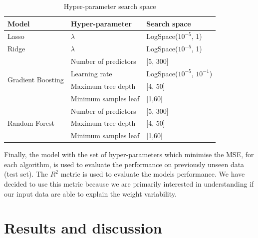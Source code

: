 \begin{table}
\centering
\caption{Hyper-parameter search space}
\label{tab:Hyper-parameter search space}
\begin{tabular}{lll} 
\toprule
\textbf{Model}                            & \textbf{Hyper-parameter} & \textbf{Search space}                          \\ 
\midrule
Lasso                                     & $\lambda$                & LogSpace($10^{-5}$, 1)                          \\ 
\midrule
Ridge                                     & $\lambda$                & LogSpace($10^{-5}$, 1)                          \\ 
\midrule
\multirow{4}{*}{Gradient Boosting} & Number of predictors     & [5, 300]                       \\ 
\cline{2-3}
                                          & Learning rate            & LogSpace($10^{-5}$, $10^{-1}$)    \\
\cline{2-3}
                                          & Maximum tree depth       & [4, 50]                           \\ 
\cline{2-3}
                                          & Minimum samples leaf     & [1,60]                           \\
\midrule
\multirow{3}{*}{Random Forest}  & Number of predictors     & [5, 300]                       \\ 
\cline{2-3}
                                          & Maximum tree depth       & [4, 50]                           \\ 
\cline{2-3}
                                          & Minimum samples leaf     & [1,60]                           \\
\bottomrule
\end{tabular}
\end{table}

Finally, the model with the set of hyper-parameters which minimise the MSE, for each algorithm, is used to evaluate the performance on previously unseen data (test set). The $R^2$ metric is used to evaluate the models performance. We have decided to use this metric because we are primarily interested in understanding if our input data are able to explain the weight variability. 

\section{Results and discussion} \label{Results and Discussions}

